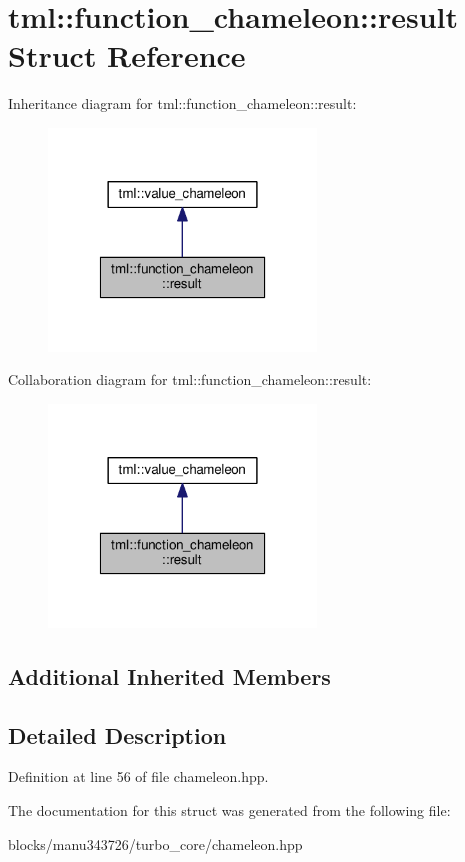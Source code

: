 \hypertarget{structtml_1_1function__chameleon_1_1result}{\section{tml\+:\+:function\+\_\+chameleon\+:\+:result Struct Reference}
\label{structtml_1_1function__chameleon_1_1result}
}


Inheritance diagram for tml\+:\+:function\+\_\+chameleon\+:\+:result\+:
\nopagebreak
\begin{figure}[H]
\begin{center}
\leavevmode
\includegraphics[width=202pt]{structtml_1_1function__chameleon_1_1result__inherit__graph}
\end{center}
\end{figure}


Collaboration diagram for tml\+:\+:function\+\_\+chameleon\+:\+:result\+:
\nopagebreak
\begin{figure}[H]
\begin{center}
\leavevmode
\includegraphics[width=202pt]{structtml_1_1function__chameleon_1_1result__coll__graph}
\end{center}
\end{figure}
\subsection*{Additional Inherited Members}


\subsection{Detailed Description}


Definition at line 56 of file chameleon.\+hpp.



The documentation for this struct was generated from the following file\+:\begin{DoxyCompactItemize}
\item 
blocks/manu343726/turbo\+\_\+core/chameleon.\+hpp\end{DoxyCompactItemize}
